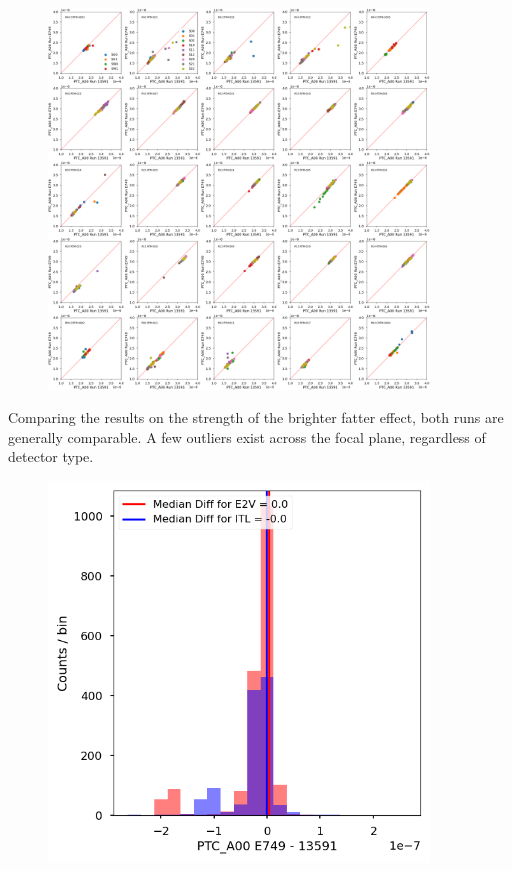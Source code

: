 \begin{figure}
\begin{centering}
\includegraphics[width=0.9\textwidth]{sections/figures/baselineCharacterization/13591_E749_PTC_A00.png}
\end{centering}
\end{figure}

Comparing the results on the strength of the brighter fatter effect,
both runs are generally comparable. A few outliers exist across the
focal plane, regardless of detector type.

\begin{figure}
\begin{centering}
\includegraphics[width=0.9\textwidth]{sections/figures/baselineCharacterization/PTC_A00_13591_E749_diff.png}
\end{centering}
\end{figure}

